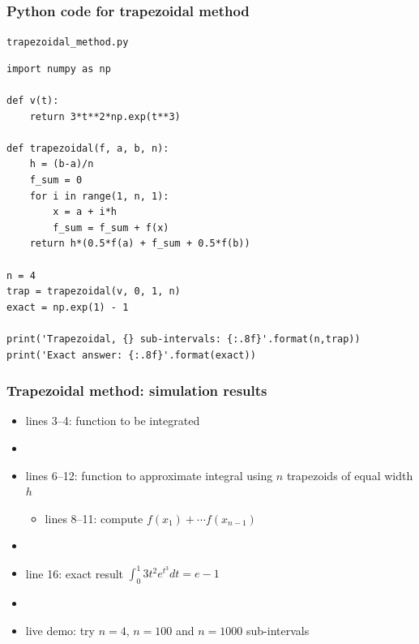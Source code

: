 \documentclass[english,14pt]{beamer}
\begin{document}

\begin{frame}[fragile]

\frametitle{Python code for trapezoidal method}

\texttt{trapezoidal\_method.py}
\begin{lstlisting}[style=CStyle,basicstyle=\scriptsize]
import numpy as np

def v(t):
    return 3*t**2*np.exp(t**3)

def trapezoidal(f, a, b, n):
    h = (b-a)/n
    f_sum = 0
    for i in range(1, n, 1):
        x = a + i*h
        f_sum = f_sum + f(x)
    return h*(0.5*f(a) + f_sum + 0.5*f(b))

n = 4
trap = trapezoidal(v, 0, 1, n)
exact = np.exp(1) - 1

print('Trapezoidal, {} sub-intervals: {:.8f}'.format(n,trap))
print('Exact answer: {:.8f}'.format(exact))
\end{lstlisting}

\end{frame}


\begin{frame}[fragile]

\frametitle{Trapezoidal method: simulation results}

\begin{itemize}
	\item lines 3--4: function to be integrated
	\item[]
	\item lines 6--12: function to approximate integral using $n$ trapezoids of equal width $h$
	\begin{itemize}
		\item lines 8--11: compute $f(x_1) + \cdots f(x_{n-1})$
	\end{itemize}
	\item[]
	\item line 16: exact result $\int_0^1 3t^2e^{t^3}dt = e - 1$
	\item[]
	\item live demo: try $n=4$, $n=100$ and $n=1000$ sub-intervals
\end{itemize}

\end{frame}
\end{document}
